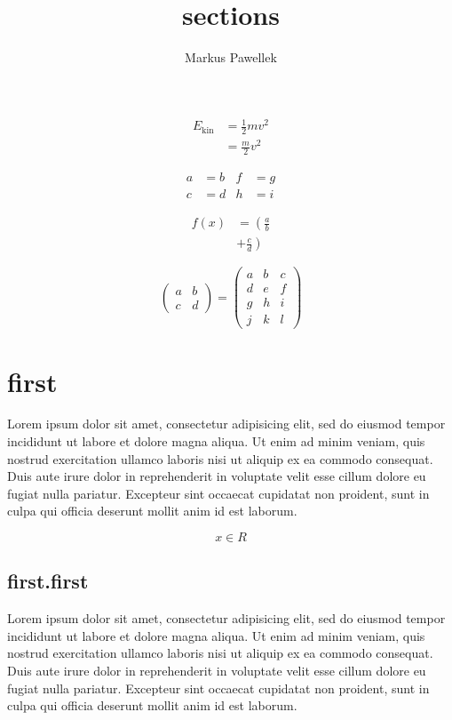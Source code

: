 \documentclass[twocolumn,a4paper,fleqn]{article}
\title{sections}
\author{Markus Pawellek}
\begin{document}
  \maketitle


  \begin{align}
    E_\mathrm{kin} &= \frac{1}{2}mv^2 \\
    &= \frac{m}{2}v^2
  \end{align}

  \begin{align*}
    a&=b & f&=g \\
    c&=d & h&=i
  \end{align*}

  \begin{align*}
    f(x) &= \left( \frac{a}{b} \right. \\
    &+ \left. \frac{c}{d} \right)
  \end{align*}

  \[
    \begin{pmatrix}
      a & b \\
      c & d
    \end{pmatrix}
    =
    \begin{pmatrix}
      a & b & c \\
      d & e & f \\
      g & h & i \\
      j & k & l
    \end{pmatrix}
  \]


  \section{first}
  Lorem ipsum dolor sit amet, consectetur adipisicing elit, sed do eiusmod
  tempor incididunt ut labore et dolore magna aliqua. Ut enim ad minim veniam,
  quis nostrud exercitation ullamco laboris nisi ut aliquip ex ea commodo
  consequat. Duis aute irure dolor in reprehenderit in voluptate velit esse
  cillum dolore eu fugiat nulla pariatur. Excepteur sint occaecat cupidatat non
  proident, sunt in culpa qui officia deserunt mollit anim id est laborum.

  \[
    x \in R
  \]

  \subsection{first.first}
  Lorem ipsum dolor sit amet, consectetur adipisicing elit, sed do eiusmod
  tempor incididunt ut labore et dolore magna aliqua. Ut enim ad minim veniam,
  quis nostrud exercitation ullamco laboris nisi ut aliquip ex ea commodo
  consequat. Duis aute irure dolor in reprehenderit in voluptate velit esse
  cillum dolore eu fugiat nulla pariatur. Excepteur sint occaecat cupidatat non
  proident, sunt in culpa qui officia deserunt mollit anim id est laborum.
\end{document}
